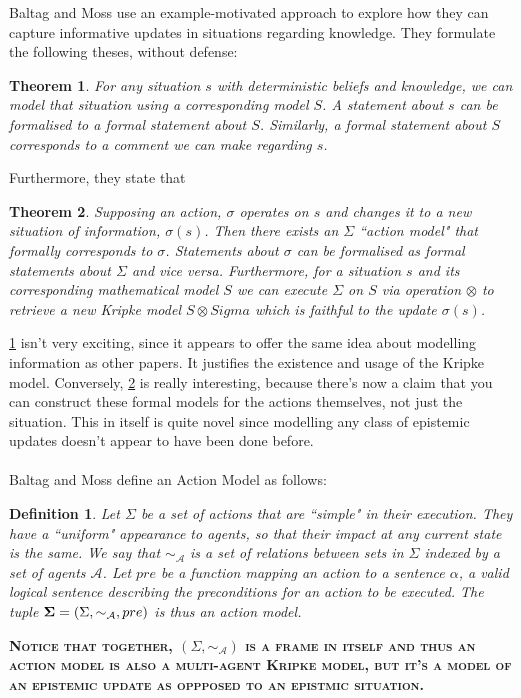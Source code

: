 \documentclass[10pt, a4paper, twoside]{article}
\newcommand{\aRel}[1] {
  \sim_{\mathcal{#1} }
}
\newcommand{\kripkeFrame}[2] {
  (#1, \aRel{#2})
}
\newcommand{\actModel}[3]{
  (#1, \aRel{#2}, #3)
}
\newcommand{\note}[1]{\textsc{\textbf{#1}}}
\newtheorem{defn}{Definition}
\newtheorem{thm}{Theorem}
\begin{document}
Baltag and Moss use an example-motivated approach to explore how they can
capture informative updates in situations regarding knowledge.
They formulate the following theses, without defense:
\begin{thm}\label{situationModel}
For any situation $s$ with deterministic beliefs and knowledge, we can model
that situation using a corresponding model $S$.
A statement about $s$ can be formalised to a formal statement about $S$.
Similarly, a formal statement about $S$ corresponds to a comment we can make
regarding $s$.
\end{thm}
Furthermore, they state that
\begin{thm}\label{actionModelExists}
Supposing an action, $\sigma$ operates on $s$ and changes it to a new situation
of information, $\sigma(s)$.
Then there exists an $\Sigma$ ``action model" that formally corresponds to
$\sigma$.
Statements about $\sigma$ can be formalised as formal statements about $\Sigma$
and vice versa.
Furthermore, for a situation $s$ and its corresponding mathematical model $S$ we
can execute $\Sigma$ on $S$ via operation $\otimes$ to retrieve a new Kripke
model $S \otimes Sigma$ which is faithful to the update $\sigma(s)$.
\end{thm}
\ref{situationModel} isn't very exciting, since it appears to offer the same
idea about modelling information as other papers.
It justifies the existence and usage of the Kripke model.
Conversely, \ref{actionModelExists} is really interesting, because there's now
a claim that you can construct these formal models for the actions themselves,
not just the situation.
This in itself is quite novel since modelling any class of epistemic updates
doesn't appear to have been done before.\\
\\
Baltag and Moss define an Action Model as follows:
\begin{defn}
Let $\Sigma$ be a set of actions that are ``simple" in their execution.
They have a ``uniform" appearance to agents, so that their impact at any current
state is the same.
We say that $\aRel{A}$ is a set of relations between sets in $\Sigma$ indexed
by a set of agents $\mathcal{A}$.
Let $pre$ be a function mapping an action to a sentence $\alpha$, a valid
logical sentence describing the preconditions for an action to be executed.
The tuple ${\bf \Sigma} = \actModel{\Sigma}{A}{pre}$ is thus an action model.
\end{defn}
\note{Notice that together, $\kripkeFrame{\Sigma}{A}$ is a frame in
itself and thus an action model is also a multi-agent Kripke model, but it's a
model of an epistemic update as oppposed to an epistmic situation.}\\
\end{document}
